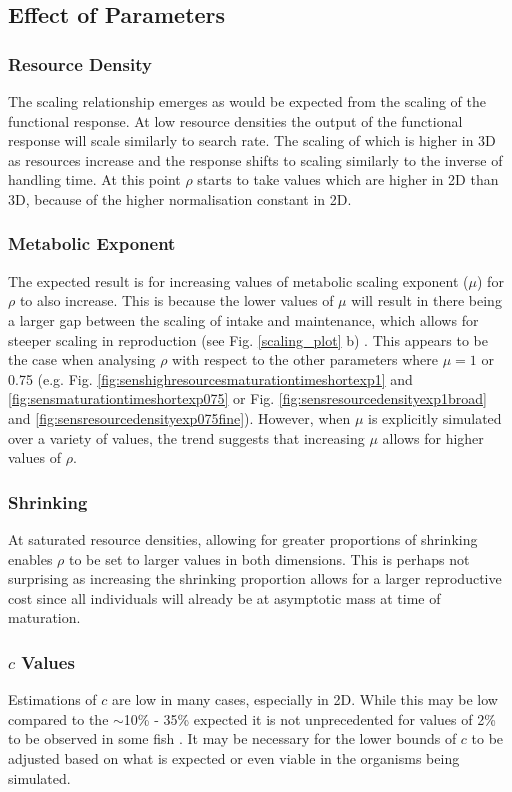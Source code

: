 \documentclass[a4paper, 11pt, hidelinks]{article} %
\begin{document}
	
	\subsection{Effect of Parameters}
	\subsubsection{Resource Density}
	The scaling relationship emerges as would be expected from the scaling of the functional response.  At low resource densities the output of the functional response will scale similarly to search rate.  The scaling of which is higher in 3D as resources increase and the response shifts to scaling similarly to the inverse of handling time.  At this point $\rho$ starts to take values which are higher in 2D than 3D, because of the higher normalisation constant in 2D.
	
	\subsubsection{Metabolic Exponent}
	The expected result is for increasing values of metabolic scaling exponent ($\mu$) for $\rho$ to also increase.  This is because the lower values of $\mu$ will result in there being a larger gap between the scaling of intake and maintenance, which allows for steeper scaling in reproduction (see Fig. \ref{scaling_plot} b) \parencite{Marshall2019}.  This appears to be the case when analysing $\rho$ with respect to the other parameters where $\mu = 1$ or 0.75 (e.g. Fig. \ref{fig:senshighresourcesmaturationtimeshortexp1} and \ref{fig:sensmaturationtimeshortexp075} or Fig. \ref{fig:sensresourcedensityexp1broad} and \ref{fig:sensresourcedensityexp075fine}).  However, when $\mu$ is explicitly simulated over a variety of values, the trend suggests that increasing $\mu$ allows for higher values of $\rho$.  
	
	\subsubsection{Shrinking}
	At saturated resource densities, allowing for greater proportions of shrinking enables $\rho$ to be set to larger values in both dimensions.  This is perhaps not surprising as increasing the shrinking proportion allows for a larger reproductive cost since all individuals will already be at asymptotic mass at time of maturation.
	
	\subsubsection{$c$ Values}
	Estimations of $c$ are low in many cases, especially in 2D.  While this may be low compared to the $\sim$10\% - 35\% expected \parencite{Benoit2018, Fontoura2009, Roff1983} it is not unprecedented for values of 2\% to be observed in some fish \parencite{Gunderson1997}.  It may be necessary for the lower bounds of $c$ to be adjusted based on what is expected or even viable in the organisms being simulated.
	
\end{document}
